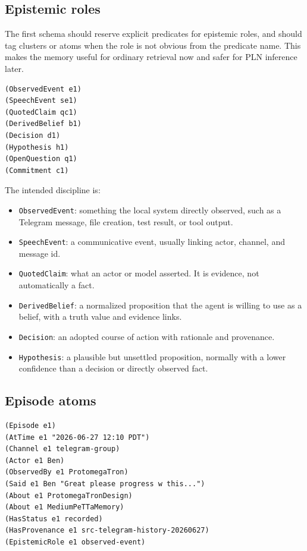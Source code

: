 \documentclass[11pt]{article}
\begin{document}
\subsection{Epistemic roles}

The first schema should reserve explicit predicates for epistemic roles, and should
tag clusters or atoms when the role is not obvious from the predicate name.  This
makes the memory useful for ordinary retrieval now and safer for PLN inference later.

\begin{verbatim}
(ObservedEvent e1)
(SpeechEvent se1)
(QuotedClaim qc1)
(DerivedBelief b1)
(Decision d1)
(Hypothesis h1)
(OpenQuestion q1)
(Commitment c1)
\end{verbatim}

The intended discipline is:
\begin{itemize}
  \item \texttt{ObservedEvent}: something the local system directly observed, such as
        a Telegram message, file creation, test result, or tool output.
  \item \texttt{SpeechEvent}: a communicative event, usually linking actor, channel,
        and message id.
  \item \texttt{QuotedClaim}: what an actor or model asserted.  It is evidence, not
        automatically a fact.
  \item \texttt{DerivedBelief}: a normalized proposition that the agent is willing to
        use as a belief, with a truth value and evidence links.
  \item \texttt{Decision}: an adopted course of action with rationale and provenance.
  \item \texttt{Hypothesis}: a plausible but unsettled proposition, normally with a
        lower confidence than a decision or directly observed fact.
\end{itemize}

\subsection{Episode atoms}

\begin{verbatim}
(Episode e1)
(AtTime e1 "2026-06-27 12:10 PDT")
(Channel e1 telegram-group)
(Actor e1 Ben)
(ObservedBy e1 ProtomegaTron)
(Said e1 Ben "Great please progress w this...")
(About e1 ProtomegaTronDesign)
(About e1 MediumPeTTaMemory)
(HasStatus e1 recorded)
(HasProvenance e1 src-telegram-history-20260627)
(EpistemicRole e1 observed-event)
\end{verbatim}
\end{document}
